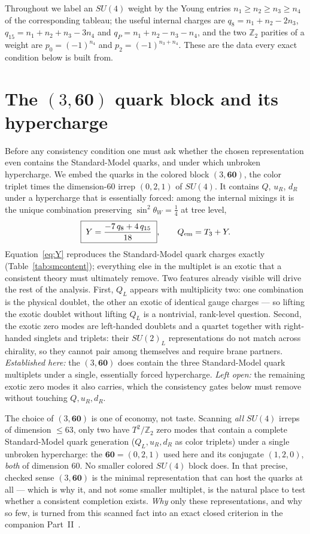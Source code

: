 \documentclass[11pt,a4paper]{article}
\begin{document}
Throughout we label an $SU(4)$ weight by the Young entries $n_1\ge n_2\ge n_3\ge n_4$
of the corresponding tableau; the useful internal charges are
$q_8=n_1+n_2-2n_3$, $q_{15}=n_1+n_2+n_3-3n_4$ and $q_P=n_1+n_2-n_3-n_4$, and the two
$\mathbb{Z}_2$ parities of a weight are $p_0=(-1)^{n_4}$ and $p_2=(-1)^{n_3+n_4}$.
These are the data every exact condition below is built from.

\section{The \texorpdfstring{$(3,\mathbf{60})$}{(3,60)} quark block and its hypercharge}\label{sec:hypercharge}
Before any consistency condition one must ask whether the chosen representation even
contains the Standard-Model quarks, and under which unbroken hypercharge. We embed the
quarks in the colored block $(3,\mathbf{60})$, the color triplet times the
dimension-$60$ irrep $(0,2,1)$ of $SU(4)$. It contains $Q$, $u_R$, $d_R$ under a
hypercharge that is essentially forced: among the internal mixings it is the unique
combination preserving $\sin^2\theta_W=\tfrac14$ at tree level,
\begin{equation}
\boxed{\;Y=\frac{-7\,q_8+4\,q_{15}}{18}\;},\qquad Q_{\rm em}=T_3+Y .
\label{eq:Y}
\end{equation}
Equation~\eqref{eq:Y} reproduces the Standard-Model quark charges exactly
(Table~\ref{tab:smcontent}); everything else in the multiplet is an exotic that a
consistent theory must ultimately remove. Two features already visible will drive the
rest of the analysis. First, $Q_L$ appears with multiplicity two: one combination is
the physical doublet, the other an exotic of identical gauge charges --- so lifting the
exotic doublet without lifting $Q_L$ is a nontrivial, rank-level question. Second, the
exotic zero modes are left-handed doublets and a quartet together with right-handed
singlets and triplets: their $SU(2)_L$ representations do not match across chirality,
so they cannot pair among themselves and require brane partners.
\emph{Established here:} the $(3,\mathbf{60})$ does contain the three Standard-Model
quark multiplets under a single, essentially forced hypercharge. \emph{Left open:} the
remaining exotic zero modes it also carries, which the consistency gates below must
remove without touching $Q,u_R,d_R$.

The choice of $(3,\mathbf{60})$ is one of economy, not taste. Scanning \emph{all}
$SU(4)$ irreps of dimension $\le 63$, only two have $T^2/\mathbb{Z}_2$ zero modes that
contain a complete Standard-Model quark generation ($Q_L,u_R,d_R$ as color triplets)
under a single unbroken hypercharge: the $\mathbf{60}=(0,2,1)$ used here and its
conjugate $(1,2,0)$, \emph{both} of dimension $60$. No smaller colored $SU(4)$ block
does. In that precise, checked sense $(3,\mathbf{60})$ is the minimal representation
that can host the quarks at all --- which is why it, and not some smaller multiplet, is
the natural place to test whether a consistent completion exists. \emph{Why} only these
representations, and why so few, is turned from this scanned fact into an exact closed
criterion in the companion Part~II~\cite{PartII}.
\end{document}
